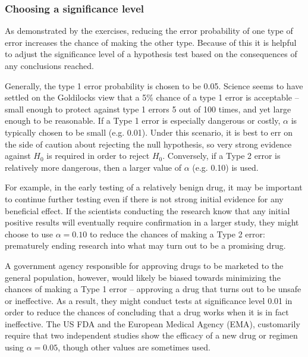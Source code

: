 \begin{spacing}{1.5}

\subsubsection{Choosing a significance level}

As demonstrated by the exercises, reducing the error probability of one type of error increases the chance of making the other type. Because of this it is helpful to adjust the significance level of a hypothesis test based on the consequences of any conclusions reached.

\label{significanceLevel}


Generally, the type 1 error probability is chosen to be 0.05.  Science seems to have settled on the Goldilocks view that a 5\% chance of a type 1 error is acceptable  -- small enough to protect against type 1 errors 5 out of 100 times, and yet large enough to be reasonable. If a Type 1 error is especially dangerous or costly,  $\alpha$ is typically chosen to be small (e.g. 0.01). Under this scenario, it is best to err on the side of caution about rejecting the null hypothesis, so very strong evidence against $H_0$ is required in order to reject $H_0$. Conversely, if a Type 2 error is relatively more dangerous, then a larger value of $\alpha$ (e.g. 0.10) is used. 

For example, in the early testing of a relatively benign drug, it may be important to continue further testing even if there is not strong initial evidence for any beneficial effect. If the scientists conducting the research know that any initial positive results will eventually require confirmation in a larger study, they might choose to use $\alpha = 0.10$ to reduce the chances of making a Type 2 error: prematurely ending research into what may turn out to be a promising drug. 

A government agency responsible for approving drugs to be marketed to the general population, however, would likely be biased towards minimizing the chances of making a Type 1 error -- approving a drug that turns out to be unsafe or ineffective. As a result, they might conduct tests at significance level 0.01 in order to reduce the chances of concluding that a drug works when it is in fact ineffective. The US FDA and the European Medical Agency (EMA), customarily require that two independent studies show the efficacy of a new drug or regimen using $\alpha = 0.05$, though other values are sometimes used.


\end{spacing}
